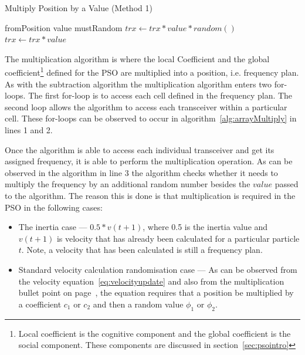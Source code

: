 \begin{algorithm}[H]
\caption{Multiply Position by a Value (Method 1)}
\label{alg:arrayMultiply}
\begin{algorithmic}[1]
	\Require fromPosition
	\Require value
	\Require mustRandom
				\State $trx \leftarrow trx * value * random()$
			\Else
				\State $trx \leftarrow trx * value$
			\EndIf
		\EndFor
	\EndFor
\end{algorithmic}
\end{algorithm}

The multiplication algorithm is where the local Coefficient and the global coefficient\footnote{Local coefficient is the cognitive component and the global coefficient is the social component. These components are discussed in section~\ref{sec:psointro}} defined for the PSO are multiplied into a position, i.e. frequency plan. As with the subtraction algorithm the multiplication algorithm enters two for-loops. The first for-loop is to access each cell defined in the frequency plan. The second loop allows the algorithm to access each transceiver within a particular cell. These for-loops can be observed to occur in algorithm~\ref{alg:arrayMultiply} in lines 1 and 2.

Once the algorithm is able to access each individual transceiver and get its assigned frequency, it is able to perform the multiplication operation. As can be observed in the algorithm in line 3 the algorithm checks whether it needs to multiply the frequency by an additional random number besides the $value$ passed to the algorithm. The reason this is done is that multiplication is required in the PSO in the following cases:

\begin{itemize}
\item The inertia case --- $0.5 * v(t+1)$, where 0.5 is the inertia value and $v(t+1)$ is velocity that has already been calculated for a particular particle $t$. Note, a velocity that has been calculated is still a frequency plan.
\item Standard velocity calculation randomisation case --- As can be observed from the velocity equation~\ref{eq:velocityupdate} and also from the multiplication bullet point on page~\pageref{lst:velocitybreakup}, the equation requires that a position be multiplied by a coefficient $c_1$ or $c_2$ and then a random value $\phi_1$ or $\phi_2$. 
\end{itemize}

